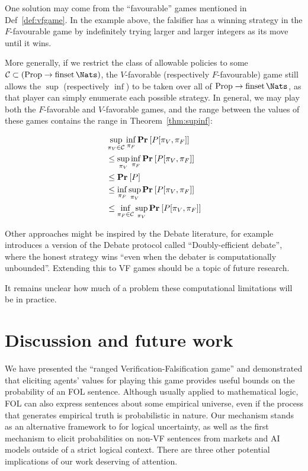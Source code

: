 
One solution may come from the ``favourable'' games mentioned in Def~\ref{def:vfgame}. In the example above, the falsifier has a winning strategy in the $F$-favourable game by indefinitely trying larger and larger integers as its move until it wins.

More generally, if we restrict the class of allowable policies to some $\Compcl\subset(\Props\to\finset\Nats)$, the $V$-favorable (respectively $F$-favourable) game still allows the $\sup$ (respectively $\inf$) to be taken over all of $\Props\to\finset\Nats$, as that player can simply enumerate each possible strategy. In general, we may play both the $F$-favorable and $V$-favorable games, and the range between the values of these games contains the range in Theorem~\ref{thm:supinf}:

\begin{align}
&\sup_{\pi_V\in\Compcl}\inf_{\pi_F}\VFPAPERProb{P[\pi_V,\pi_F]}\nonumber\\
&\le
\sup_{\pi_V}\inf_{\pi_F}\VFPAPERProb{P[\pi_V,\pi_F]}\nonumber\\
&\le
\VFPAPERProb{P}\label{eq:bounds}\\
&\le
\inf_{\pi_F}\sup_{\pi_V}\VFPAPERProb{P[\pi_V,\pi_F]}\nonumber\\
&\le
\inf_{\pi_F\in\Compcl}\sup_{\pi_V}\VFPAPERProb{P[\pi_V,\pi_F]}\nonumber
\end{align}

Other approaches might be inspired by the Debate literature, for example \cite{brown-cohenScalableAISafety2023} introduces a version of the Debate protocol called ``Doubly-efficient debate'', where the honest strategy wins ``even when the debater is computationally unbounded''. Extending this to VF games should be a topic of future research.

It remains unclear how much of a problem these computational limitations will be in practice.

\section{Discussion and future work}
\label{vf/sec:conclusion}

We have presented the ``ranged Verification-Falsification game'' and demonstrated that eliciting agents' values for playing this game provides useful bounds on the probability of an FOL sentence. Although usually applied to mathematical logic, FOL can also express sentences about some empirical universe, even if the process that generates empirical truth is probabilistic in nature. Our mechanism stands as an alternative framework to \cite{garrabrantLogicalInduction2020} for logical uncertainty, as well as the first mechanism to elicit probabilities on non-VF sentences from markets and AI models outside of a strict logical context. There are three other potential implications of our work deserving of attention.

